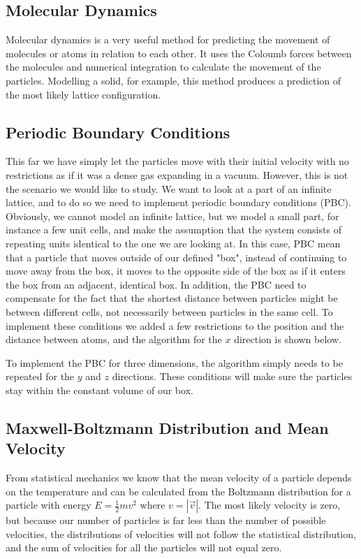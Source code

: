 \documentclass{article}
\begin{document}
\subsection{Molecular Dynamics}
Molecular dynamics is a very useful method for predicting the movement of molecules or atoms in relation to each other. It uses the Coloumb forces between the molecules and numerical integration to calculate the movement of the particles. Modelling a solid, for example, this method produces a prediction of the most likely lattice configuration.

\subsection{Periodic Boundary Conditions}
This far we have simply let the particles move with their initial velocity with no restrictions as if it was a dense gas expanding in a vacuum. However, this is not the scenario we would like to study. We want to look at a part of an infinite lattice, and to do so we need to implement periodic boundary conditions (PBC). Obviously, we cannot model an infinite lattice, but we model a small part, for instance a few unit cells, and make the assumption that the system consists of repeating units identical to the one we are looking at. In this case, PBC mean that a particle that moves outside of our defined "box", instead of continuing to move away from the box, it moves to the opposite side of the box as if it enters the box from an adjacent, identical box. In addition, the PBC need to compensate for the fact that the shortest distance between particles might be between different cells, not necessarily between particles in the same cell. To implement these conditions we added a few restrictions to the position and the distance between atoms, and the algorithm for the $x$ direction is shown below.

\begin{algorithm}[h]
\end{algorithm}
To implement the PBC for three dimensions, the algorithm simply needs to be repeated for the $y$ and $z$ directions. These conditions will make sure the particles stay within the constant volume of our box.


\subsection{Maxwell-Boltzmann Distribution and Mean Velocity}
From statistical mechanics we know that the mean velocity of a particle depends on the temperature and can be calculated from the Boltzmann distribution for a particle with energy $E=\frac{1}{2}mv^2$ where $v=|\vec{v}|$. The most likely velocity is zero, but because our number of particles is far less than the number of possible velocities, the distributions of velocities will not follow the statistical distribution, and the sum of velocities for all the particles will not equal zero. 
\end{document}

